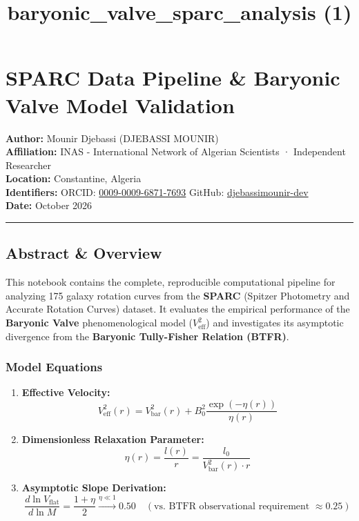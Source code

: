 \documentclass[11pt]{article}
\title{baryonic\_valve\_sparc\_analysis (1)}
\providecommand{\tightlist}{%
      \setlength{\itemsep}{0pt}\setlength{\parskip}{0pt}}
\begin{document}
    
    \maketitle
    
    

    
    \section{SPARC Data Pipeline \& Baryonic Valve Model
Validation}\label{sparc-data-pipeline-baryonic-valve-model-validation}

\textbf{Author:} Mounir Djebassi (DJEBASSI MOUNIR)\\
\textbf{Affiliation:} INAS - International Network of Algerian
Scientists · Independent Researcher\\
\textbf{Location:} Constantine, Algeria\\
\textbf{Identifiers:} ORCID:
\href{https://orcid.org/0009-0009-6871-7693}{0009-0009-6871-7693}
\textbar{} GitHub:
\href{https://github.com/djebassimounir-dev}{djebassimounir-dev}\\
\textbf{Date:} October 2026

\begin{center}\rule{0.5\linewidth}{0.5pt}\end{center}

\subsection{Abstract \& Overview}\label{abstract-overview}

This notebook contains the complete, reproducible computational pipeline
for analyzing 175 galaxy rotation curves from the \textbf{SPARC}
(Spitzer Photometry and Accurate Rotation Curves) dataset. It evaluates
the empirical performance of the \textbf{Baryonic Valve}
phenomenological model (\(V_{\text{eff}}^2\)) and investigates its
asymptotic divergence from the \textbf{Baryonic Tully-Fisher Relation
(BTFR)}.

\subsubsection{Model Equations}\label{model-equations}

\begin{enumerate}
\def\labelenumi{\arabic{enumi}.}
\tightlist
\item
  \textbf{Effective Velocity:}
  \[V_{\text{eff}}^2(r) = V_{\text{bar}}^2(r) + B_0^2 \frac{\exp(-\eta(r))}{\eta(r)}\]
\item
  \textbf{Dimensionless Relaxation Parameter:}
  \[\eta(r) = \frac{l(r)}{r} = \frac{l_0}{V_{\text{bar}}^2(r) \cdot r}\]
\item
  \textbf{Asymptotic Slope Derivation:}
  \[\frac{d\ln V_{\text{flat}}}{d\ln M} = \frac{1+\eta}{2} \xrightarrow{\eta \ll 1} 0.50 \quad (\text{vs. BTFR observational requirement } \approx 0.25)\]
\end{enumerate}
\end{document}
